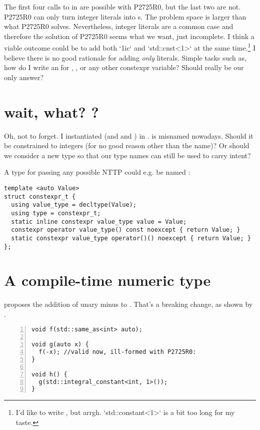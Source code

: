 The first four calls to  in  are possible with P2725R0,
but the last two are not.
P2725R0 can only turn integer literals into s.
The problem space is larger than what P2725R0 solves.
Nevertheless, integer literals are a common case and therefore the solution of
P2725R0 seems what we want, just incomplete.
I think a viable outcome could be to add both `1ic` and `std::cnst<1>` at the
same time.\footnote{I'd like to write , but arrgh.
  `std::constant<1>` is a bit too long for my taste.}
I believe there is no good rationale for adding \emph{only}
 literals.
Simple tasks such as, how do I write an  for
, , or any other constexpr
variable?
Should \std{} really be our only answer?

\section{wait, what? ?}
Oh, not to forget.
I instantiated  (and  and
) in .
 is misnamed nowadays.
Should it be constrained to integers (for no good reason other than the name)?
Or should we consider a new type so that our type names can still be used to carry intent?

A type for passing any possible NTTP could e.g. be named :
\medskip\begin{lstlisting}[style=Vc]
template <auto Value>
struct constexpr_t {
  using value_type = decltype(Value);
  using type = constexpr_t;
  static inline constexpr value_type value = Value;
  constexpr operator value_type() const noexcept { return Value; }
  static constexpr value_type operator()() noexcept { return Value; }
};
\end{lstlisting}

\section{A compile-time numeric type}
\textcite{P2725R0} proposes the addition of unary minus to .
That's a breaking change, as shown by .
\begin{lstlisting}[numbers=left,float={hbtp},label=lst:breaking,caption={
    Adding unary minus to \code{integral_constant} is a breaking change
}]
void f(std::same_as<int> auto);

void g(auto x) {
  f(-x); //valid now, ill-formed with P2725R0:
}

void h() {
  g(std::integral_constant<int, 1>());
}
\end{lstlisting}

